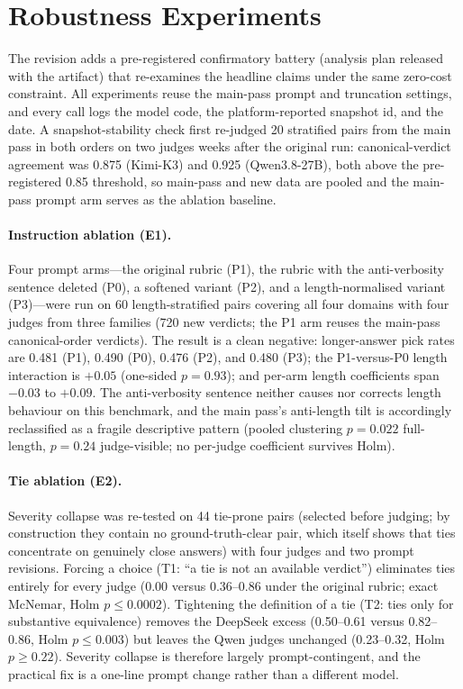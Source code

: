 \documentclass[review,12pt]{elsarticle}
\begin{document}
\section{Robustness Experiments}
\label{sec:robust}

The revision adds a pre-registered confirmatory battery (analysis plan
released with the artifact) that re-examines the headline claims under the
same zero-cost constraint. All experiments reuse the main-pass prompt and
truncation settings, and every call logs the model code, the
platform-reported snapshot id, and the date. A snapshot-stability check
first re-judged 20 stratified pairs from the main pass in both orders on
two judges weeks after the original run: canonical-verdict agreement was
0.875 (Kimi-K3) and 0.925 (Qwen3.8-27B), both above the pre-registered
0.85 threshold, so main-pass and new data are pooled and the main-pass
prompt arm serves as the ablation baseline.

\paragraph{Instruction ablation (E1).}
Four prompt arms---the original rubric (P1), the rubric with the
anti-verbosity sentence deleted (P0), a softened variant (P2), and a
length-normalised variant (P3)---were run on 60 length-stratified pairs
covering all four domains with four judges from three families (720 new
verdicts; the P1 arm reuses the main-pass canonical-order verdicts). The
result is a clean negative: longer-answer pick rates are 0.481 (P1),
0.490 (P0), 0.476 (P2), and 0.480 (P3); the P1-versus-P0 length
interaction is $+0.05$ (one-sided $p=0.93$); and per-arm length
coefficients span $-0.03$ to $+0.09$. The anti-verbosity sentence neither
causes nor corrects length behaviour on this benchmark, and the main
pass's anti-length tilt is accordingly reclassified as a fragile
descriptive pattern (pooled clustering $p=0.022$ full-length, $p=0.24$
judge-visible; no per-judge coefficient survives Holm).

\paragraph{Tie ablation (E2).}
Severity collapse was re-tested on 44 tie-prone pairs (selected before
judging; by construction they contain no ground-truth-clear pair, which
itself shows that ties concentrate on genuinely close answers) with four
judges and two prompt revisions. Forcing a choice (T1: ``a tie is not an
available verdict'') eliminates ties entirely for every judge (0.00
versus 0.36--0.86 under the original rubric; exact McNemar, Holm
$p\le 0.0002$). Tightening the definition of a tie (T2: ties only for
substantive equivalence) removes the DeepSeek excess (0.50--0.61 versus
0.82--0.86, Holm $p\le 0.003$) but leaves the Qwen judges unchanged
(0.23--0.32, Holm $p\ge 0.22$). Severity collapse is therefore largely
prompt-contingent, and the practical fix is a one-line prompt change
rather than a different model.
\end{document}
